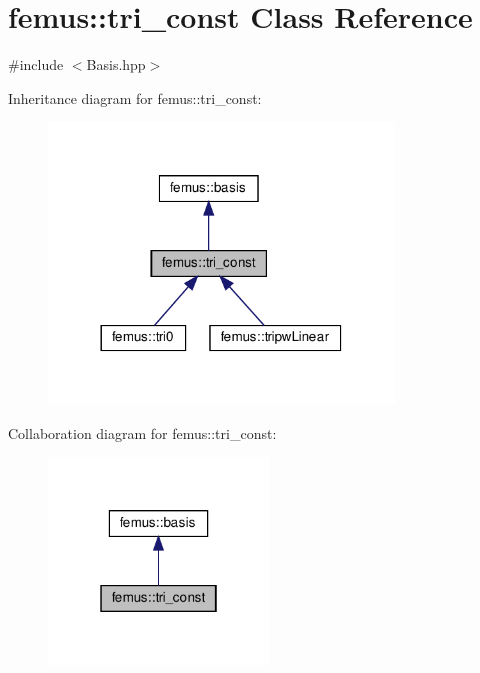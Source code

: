 \hypertarget{classfemus_1_1tri__const}{}\section{femus\+:\+:tri\+\_\+const Class Reference}
\label{classfemus_1_1tri__const}


{\ttfamily \#include $<$Basis.\+hpp$>$}



Inheritance diagram for femus\+:\+:tri\+\_\+const\+:
\nopagebreak
\begin{figure}[H]
\begin{center}
\leavevmode
\includegraphics[width=260pt]{classfemus_1_1tri__const__inherit__graph}
\end{center}
\end{figure}


Collaboration diagram for femus\+:\+:tri\+\_\+const\+:
\nopagebreak
\begin{figure}[H]
\begin{center}
\leavevmode
\includegraphics[width=166pt]{classfemus_1_1tri__const__coll__graph}
\end{center}
\end{figure}

